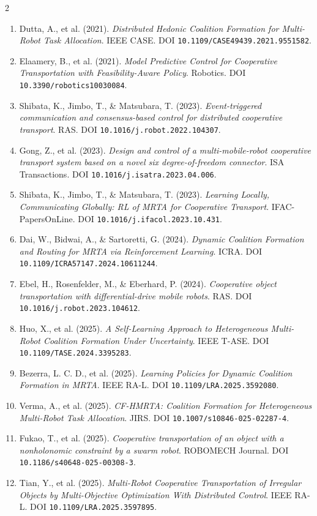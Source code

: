 \documentclass[10pt,letterpaper]{article}
\begin{document}
\begin{multicols}{2}
\begin{enumerate}[leftmargin=3.7mm,itemsep=0pt,topsep=0pt,parsep=0pt,partopsep=0pt]
\item Dutta, A., et al. (2021). \textit{Distributed Hedonic Coalition Formation for Multi-Robot Task Allocation}. IEEE CASE. DOI \nolinkurl{10.1109/CASE49439.2021.9551582}.
\item Elaamery, B., et al. (2021). \textit{Model Predictive Control for Cooperative Transportation with Feasibility-Aware Policy}. Robotics. DOI \nolinkurl{10.3390/robotics10030084}.
\item Shibata, K., Jimbo, T., \& Matsubara, T. (2023). \textit{Event-triggered communication and consensus-based control for distributed cooperative transport}. RAS. DOI \nolinkurl{10.1016/j.robot.2022.104307}.
\item Gong, Z., et al. (2023). \textit{Design and control of a multi-mobile-robot cooperative transport system based on a novel six degree-of-freedom connector}. ISA Transactions. DOI \nolinkurl{10.1016/j.isatra.2023.04.006}.
\item Shibata, K., Jimbo, T., \& Matsubara, T. (2023). \textit{Learning Locally, Communicating Globally: RL of MRTA for Cooperative Transport}. IFAC-PapersOnLine. DOI \nolinkurl{10.1016/j.ifacol.2023.10.431}.
\item Dai, W., Bidwai, A., \& Sartoretti, G. (2024). \textit{Dynamic Coalition Formation and Routing for MRTA via Reinforcement Learning}. ICRA. DOI \nolinkurl{10.1109/ICRA57147.2024.10611244}.
\item Ebel, H., Rosenfelder, M., \& Eberhard, P. (2024). \textit{Cooperative object transportation with differential-drive mobile robots}. RAS. DOI \nolinkurl{10.1016/j.robot.2023.104612}.
\item Huo, X., et al. (2025). \textit{A Self-Learning Approach to Heterogeneous Multi-Robot Coalition Formation Under Uncertainty}. IEEE T-ASE. DOI \nolinkurl{10.1109/TASE.2024.3395283}.
\item Bezerra, L. C. D., et al. (2025). \textit{Learning Policies for Dynamic Coalition Formation in MRTA}. IEEE RA-L. DOI \nolinkurl{10.1109/LRA.2025.3592080}.
\item Verma, A., et al. (2025). \textit{CF-HMRTA: Coalition Formation for Heterogeneous Multi-Robot Task Allocation}. JIRS. DOI \nolinkurl{10.1007/s10846-025-02287-4}.
\item Fukao, T., et al. (2025). \textit{Cooperative transportation of an object with a nonholonomic constraint by a swarm robot}. ROBOMECH Journal. DOI \nolinkurl{10.1186/s40648-025-00308-3}.
\item Tian, Y., et al. (2025). \textit{Multi-Robot Cooperative Transportation of Irregular Objects by Multi-Objective Optimization With Distributed Control}. IEEE RA-L. DOI \nolinkurl{10.1109/LRA.2025.3597895}.

\end{enumerate}
\end{multicols}
\end{document}
